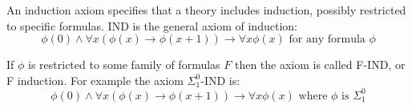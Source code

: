 \documentclass[12pt]{article}
\begin{document}
An induction axiom specifies that a theory includes induction, possibly restricted to specific formulas.  IND is the general axiom of induction:
$$\phi(0)\wedge\forall x(\phi(x)\rightarrow\phi(x+1))\rightarrow \forall x\phi(x)\text{ for any formula }\phi$$

If $\phi$ is restricted to some family of formulas $F$ then the axiom is called F-IND, or F induction.  For example the axiom $\Sigma^0_1$-IND is:
$$\phi(0)\wedge\forall x(\phi(x)\rightarrow\phi(x+1))\rightarrow \forall x\phi(x)\text{ where }\phi\text{ is }\Sigma^0_1$$
\end{document}
